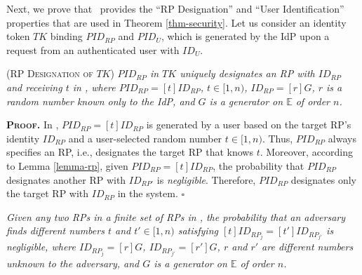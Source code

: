 
\vspace{2mm}
Next, we prove that \usso\ provides the ``RP Designation'' and ``User Identification'' properties that are used in Theorem \ref{thm-security}. Let us consider an identity token $TK$ binding $PID_{RP}$ and $PID_U$, which is generated by the IdP upon a request from an authenticated user with $ID_U$.

\begin{thm}
\textsc{(RP Designation of $TK$)}  \emph{$PID_{RP}$ in $TK$ uniquely designates an RP with $ID_{RP}$ and receiving $t$ in \usso, where $PID_{RP}= [t]ID_{RP}$, $t \in [1,n)$, $ID_{RP} = [r]G$, $r$ is a random number known only to the IdP, and $G$ is a generator on $\mathbb{E}$ of order $n$.}
\label{thm-rp-designation}
\end{thm}

\noindent\textbf{\textsc{Proof.}} In \usso, $PID_{RP}=[t]ID_{RP}$ is generated by a user based on the target RP's identity $ID_{RP}$ and a user-selected random number $t \in [1,n)$.
Thus, $PID_{RP}$ always specifies an RP, i.e., %
designates the target RP that knows $t$. 
Moreover, according to Lemma \ref{lemma-rp}, given $PID_{RP} = [t]ID_{RP}$, the probability that $PID_{RP}$ designates another RP with $ID_{RP'}$ is \emph{negligible}. %
Therefore, $PID_{RP}$ designates only the target RP with $ID_{RP}$ in the system.  \hfill $\square$


\begin{lemma}
\emph{Given any two RPs in a finite set of RPs in \usso,
 the probability that an adversary finds different numbers $t$ and $t' \in [1,n)$ satisfying $[t]ID_{RP_j} = [t']ID_{RP_{j'}}$ is negligible, where $ID_{RP_j}=[r]G$, $ID_{RP_{j'}}=[r']G$, $r$ and $r'$ are different numbers unknown to the adversary, and $G$ is a generator on $\mathbb{E}$ of order $n$.}
\label{lemma-rp}
\end{lemma}


